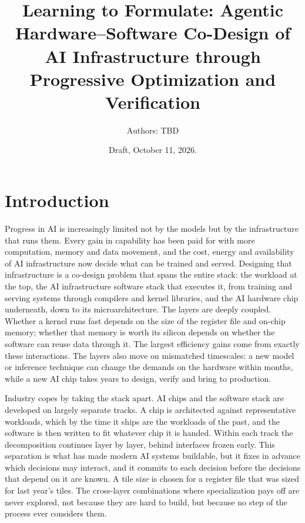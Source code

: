 \documentclass[11pt]{article}
\title{Learning to Formulate: Agentic Hardware--Software Co-Design of AI Infrastructure through Progressive Optimization and Verification}
\author{Authors: TBD}
\date{Draft, October 11, 2026.}
\begin{document}
\maketitle

\hypertarget{introduction}{%
\section{Introduction}\label{introduction}}

Progress in AI is increasingly limited not by the models but by the infrastructure that runs them. Every gain in capability has been paid for with more computation, memory and data movement, and the cost, energy and availability of AI infrastructure now decide what can be trained and served. Designing that infrastructure is a co-design problem that spans the entire stack: the workload at the top, the AI infrastructure software stack that executes it, from training and serving systems through compilers and kernel libraries, and the AI hardware chip underneath, down to its microarchitecture. The layers are deeply coupled. Whether a kernel runs fast depends on the size of the register file and on-chip memory; whether that memory is worth its silicon depends on whether the software can reuse data through it. The largest efficiency gains come from exactly these interactions. The layers also move on mismatched timescales: a new model or inference technique can change the demands on the hardware within months, while a new AI chip takes years to design, verify and bring to production.

Industry copes by taking the stack apart. AI chips and the software stack are developed on largely separate tracks. A chip is architected against representative workloads, which by the time it ships are the workloads of the past, and the software is then written to fit whatever chip it is handed. Within each track the decomposition continues layer by layer, behind interfaces frozen early. This separation is what has made modern AI systems buildable, but it fixes in advance which decisions may interact, and it commits to each decision before the decisions that depend on it are known. A tile size is chosen for a register file that was sized for last year's tiles. The cross-layer combinations where specialization pays off are never explored, not because they are hard to build, but because no step of the process ever considers them.
\end{document}
